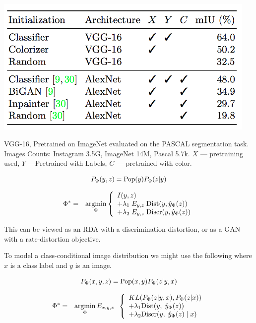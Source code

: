 {

\centerline{\includegraphics[width = 5in]{../images/LearnRepColorc}}
VGG-16, Pretrained on ImageNet evaluated on the PASCAL segmentation task.
Images Counts: {\color{red} Instagram 3.5G, ImageNet 14M, Pascal 5.7k}.
$X$ --- pretraining used, $Y$ ---Pretrained with Labels, $C$ --- pretrained with color.


{\color{red} $$P_\Phi(y,z) = \mathrm{Pop}(y)P_\Phi(z|y)$$}

\begin{eqnarray*}
\Phi^* & =  & \operatorname*{argmin}_\Phi \left\{\begin{array}{l} I(y,z) \\
+ \lambda_1\;E_{y,z}\;\mathrm{Dist}(y,\hat{y}_\Phi(z)) \\
+ \lambda_2 \;E_{y,z}\;\mathrm{Discr}(y,\hat{y}_\Phi(z))\end{array}\right.
\end{eqnarray*}

\vfill
This can be viewed as an RDA with a discrimination distortion, or as a GAN with a rate-distortion objective.



\vfill
To model a class-conditional image distribution we might use the following where $x$ is a class label and $y$ is an image.

{\color{red} $$P_\Phi(x,y,z) = \mathrm{Pop}(x,y)P_\Phi(z|y,x)$$}

\begin{eqnarray*}
\Phi^* & =  & \operatorname*{argmin}_\Phi E_{x,y,z}\;\;\left\{\begin{array}{l} KL(P_\Phi(z|y,x),P_\Phi(z|x)) \\
+ \lambda_1\mathrm{Dist}(y,\;\hat{y}_\Phi(z)) \\
+ \lambda_2 \mathrm{Discr}(y,\;\hat{y}_\Phi(z)\;|\;x)\end{array}\right.
\end{eqnarray*}


}
